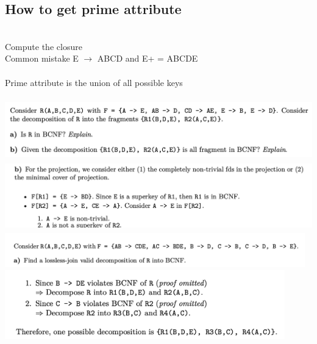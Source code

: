 \documentclass[11pt]{article}
\begin{document}
\begin{multicols*}{3}
\subsection*{How to get prime attribute}\\
Compute the closure\\
Common mistake E $\rightarrow$ ABCD and E+ = ABCDE\\
\\
Prime attribute is the union of all possible keys
\\
\\
\includegraphics[height=2.5cm]{images/b3}\\
\includegraphics[height=3cm]{images/b4}
\vspace{0.5cm}
\\
\includegraphics[height=1.5cm]{images/b7}\\
\includegraphics[height=3cm]{images/b6}
\\

\end{multicols*}
\end{document}
